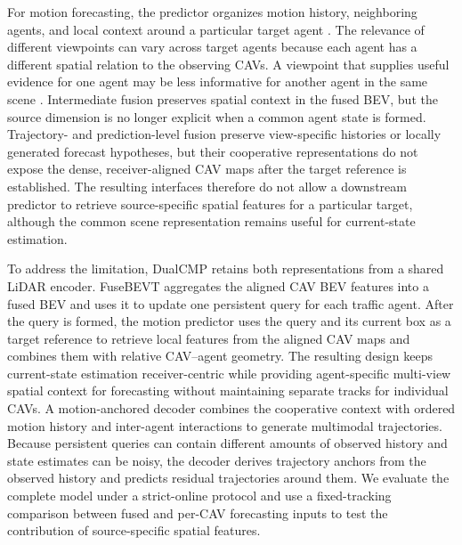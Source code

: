 \documentclass[lettersize,journal]{IEEEtran}
\begin{document}
For motion forecasting, the predictor organizes motion history, neighboring agents, and local context around a particular target agent \cite{zhou2022hivt,zhou2023qcnet}. The relevance of different viewpoints can vary across target agents because each agent has a different spatial relation to the observing CAVs. A viewpoint that supplies useful evidence for one agent may be less informative for another agent in the same scene \cite{wang2025cmp,ruan2024v2xgraph}. Intermediate fusion preserves spatial context in the fused BEV, but the source dimension is no longer explicit when a common agent state is formed. Trajectory- and prediction-level fusion preserve view-specific histories or locally generated forecast hypotheses, but their cooperative representations do not expose the dense, receiver-aligned CAV maps after the target reference is established. The resulting interfaces therefore do not allow a downstream predictor to retrieve source-specific spatial features for a particular target, although the common scene representation remains useful for current-state estimation.

To address the limitation, DualCMP retains both representations from a shared LiDAR encoder. FuseBEVT aggregates the aligned CAV BEV features into a fused BEV and uses it to update one persistent query for each traffic agent. After the query is formed, the motion predictor uses the query and its current box as a target reference to retrieve local features from the aligned CAV maps and combines them with relative CAV--agent geometry. The resulting design keeps current-state estimation receiver-centric while providing agent-specific multi-view spatial context for forecasting without maintaining separate tracks for individual CAVs. A motion-anchored decoder combines the cooperative context with ordered motion history and inter-agent interactions to generate multimodal trajectories. Because persistent queries can contain different amounts of observed history and state estimates can be noisy, the decoder derives trajectory anchors from the observed history and predicts residual trajectories around them. We evaluate the complete model under a strict-online protocol and use a fixed-tracking comparison between fused and per-CAV forecasting inputs to test the contribution of source-specific spatial features.
\end{document}
